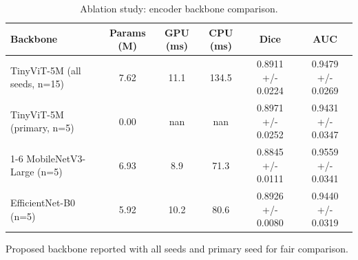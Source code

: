 \begin{table}[htbp]
  \centering
  \caption{Ablation study: encoder backbone comparison.}
  \label{tab:ablation_backbone}
  \begin{tabular}{lccccc}
    \toprule
    Backbone & Params (M) & GPU (ms) & CPU (ms) & Dice & AUC \\
    \midrule
    TinyViT-5M (all seeds, n=15) & 7.62 & 11.1 & 134.5 & 0.8911 +/- 0.0224 & 0.9479 +/- 0.0269 \\
    TinyViT-5M (primary, n=5) & 0.00 & nan & nan & 0.8971 +/- 0.0252 & 0.9431 +/- 0.0347 \\
    \cmidrule(lr){1-6}
    MobileNetV3-Large (n=5) & 6.93 & 8.9 & 71.3 & 0.8845 +/- 0.0111 & 0.9559 +/- 0.0341 \\
    EfficientNet-B0 (n=5) & 5.92 & 10.2 & 80.6 & 0.8926 +/- 0.0080 & 0.9440 +/- 0.0319 \\
    \bottomrule
  \end{tabular}
  \vspace{2pt}
  \footnotesize{Proposed backbone reported with all seeds and primary seed for fair comparison.}
\end{table}